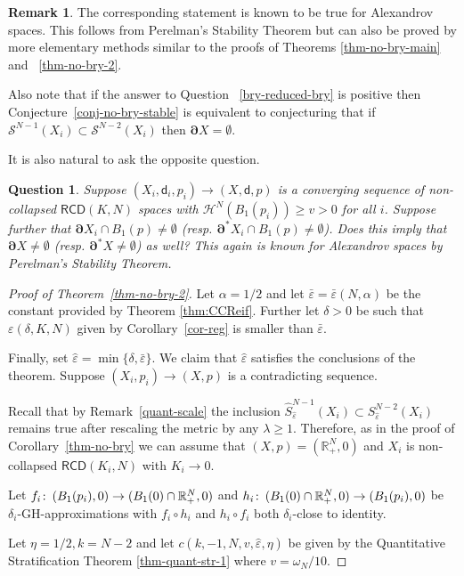 \documentclass[a4paper]{amsart}
\newcounter{assu}
\theoremstyle{plain}
\newtheorem{question}[lemma]{Question}
\theoremstyle{definition}
\newtheorem{remark}[lemma]{Remark}
\numberwithin{equation}{section}
\newcommand{\R}{\mathbb{R}}
\renewcommand{\S}{\mathcal{S}}
\newcommand{\RCD}{\mathsf{RCD}}
\newcommand{\sfd}{\mathsf d}
\newcommand{\cH}{\mathcal{H}}
\newcommand{\eps}{\varepsilon}
\newcommand{\beps}{\bar \varepsilon}
\def\co{\colon\thinspace}
\newcommand{\bRCD}{\boldsymbol\partial}
\begin{document}
{{\begin{remark}
The corresponding statement is known to be true for Alexandrov spaces.  This follows from Perelman's Stability Theorem but can also be proved by more elementary methods similar to the proofs of Theorems \ref{thm-no-bry-main} and ~\ref{thm-no-bry-2}.

Also note that if the answer to Question ~\ref{bry-reduced-bry} is positive then Conjecture~\ref{conj-no-bry-stable} is equivalent to conjecturing that if $\S^{N-1}(X_i)\subset \S^{N-2}(X_i)$ then $\bRCD X=\emptyset$.
\end{remark}

It is also natural to ask the opposite question.
\begin{question}
 Suppose  $(X_i,\sfd_{i},p_i)\to (X,\sfd, p)$  is a converging sequence of non-collapsed $\RCD(K,N)$ spaces with $\cH^{N}(B_1(p_i))\ge v>0$ for all $i$. Suppose further that
$\bRCD X_i\cap B_1(p)\ne \emptyset$ (resp. $\bRCD^*  X_i\cap B_1(p)\ne \emptyset$). Does this imply that $\bRCD X\ne \emptyset$ (resp. $\bRCD^* X \ne \emptyset$) as well? This again is known for Alexandrov spaces by Perelman's Stability Theorem.
\end{question}

\begin{proof}[Proof of Theorem~\ref{thm-no-bry-2}]
Let $\alpha=1/2$ and let $\beps=\beps(N,\alpha)$ be the constant provided by { Theorem \ref{thm:CCReif}}. Further let $\delta>0$ be such that $\eps(\delta,K,N)$ given by  Corollary~\ref{cor-reg} is smaller than $\beps$.

Finally, set $\hat\eps=\min \{\delta, \beps\}$. We claim that $\hat\eps$ satisfies the conclusions of the theorem. Suppose $(X_i,p_i)\to (X,p)$ is a contradicting sequence.

Recall that by  Remark~\ref{quant-scale} the inclusion $\hat S^{N-1}_{\hat\eps}(X_i)\subset S^{N-2}_{\hat\eps}(X_i)$ remains true after rescaling the metric by any $\lambda\ge 1$.
Therefore,  as in the proof of Corollary~\ref{thm-no-bry} we can assume that $(X,p)=(\R^N_+,0)$ and $X_i$ is non-collapsed $\RCD(K_i,N)$ with $K_i\to 0$.


Let $f_i\co (B_1(p_i),0)\to (B_1(0)\cap \R^N_+,0)$ and $h_i\co  (B_1(0)\cap \R^N_+,0)\to (B_1(p_i),0)$ be $\delta_i$-GH-approximations with $f_i\circ h_i$ and   $h_i\circ f_i$ both $\delta_i$-close to identity.


Let $\eta=1/2, k=N-2$ and let  $c(k,-1, N,v,\hat\eps,\eta)$ be given by the Quantitative Stratification Theorem \ref{thm-quant-str-1} where $v=\omega_N/10$.


\end{proof}}}
\end{document}
